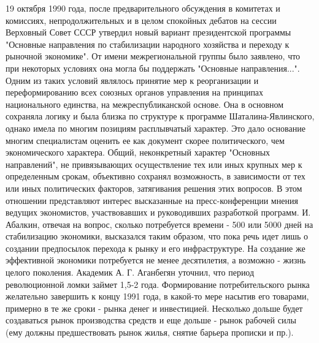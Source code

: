 \documentclass{article}
\begin{document}
\hfill

19 октября 1990 года, после предварительного обсуждения в комитетах и комиссиях, непродолжительных и в целом спокойных дебатов на сессии Верховный Совет СССР утвердил новый вариант президентской программы "Основные направления по стабилизации народного хозяйства и переходу к рыночной экономике". От имени межрегиональной группы было заявлено, что при некоторых условиях она могла бы поддержать "Основные направления...". Одним из таких условий являлось принятие мер к реорганизации и переформированию всех союзных органов управления на принципах национального единства, на межреспубликанской основе. Она в основном сохраняла логику и была близка по структуре к программе Шаталина-Явлинского, однако имела по многим позициям расплывчатый характер. Это дало основание многим специалистам оценить ее как документ скорее политического, чем экономического характера. Общий, неконкретный характер "Основных направлений", не привязывающих осуществление тех или иных крупных мер к определенным срокам, объективно сохранял возможность, в зависимости от тех или иных политических факторов, затягивания решения этих вопросов. В этом отношении представляют интерес высказанные на пресс-конференции мнения ведущих экономистов, участвовавших и руководивших разработкой программ. И. Абалкин, отвечая на вопрос, сколько потребуется времени - 500 или 5000 дней на стабилизацию экономики, высказался таким образом, что пока речь идет лишь о создании предпосылок перехода к рынку и его инфраструктуре. На создание же эффективной экономики потребуется не менее десятилетия, а возможно - жизнь целого поколения. Академик А. Г. Аганбегян уточнил, что период революционной ломки займет 1,5-2 года. Формирование потребительского рынка желательно завершить к концу 1991 года, в какой-то мере насытив его товарами, примерно в те же сроки - рынка денег и инвестицией. Несколько дольше будет создаваться рынок производства средств и еще дольше - рынок рабочей силы (ему должны предшествовать рынок жилья, снятие барьера прописки и пр.).

\hfill
\end{document}
